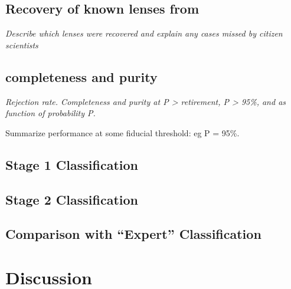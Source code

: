 \documentclass[useAMS,usenatbib,a4paper]{mn2e}
\begin{document}
\subsection{Recovery of known \cfhtls lenses from \sw}
\label{sec:results:reco}

{\it Describe which lenses were recovered and explain any cases missed by
citizen scientists}

\subsection{\cfhtls completeness and purity}
\label{sec:results:sample}

{\it Rejection rate. Completeness and purity at P > retirement, P > 95\%, and 
as function of probability P. 

Summarize performance at some fiducial threshold: eg P = 95\%.}

\subsection{Stage 1 Classification}
\label{sec:results:stage1}


\subsection{Stage 2 Classification}
\label{sec:results:stage2}



\subsection{Comparison with ``Expert'' Classification}
\label{sec:results:experts}






\section{Discussion}
\label{sec:discuss}
\end{document}
